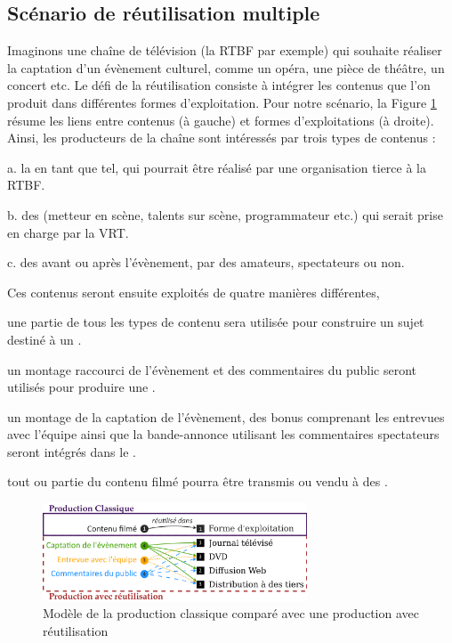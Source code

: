 \subsection{Scénario de réutilisation multiple}\label{sec:ex-reuse}
Imaginons une chaîne de télévision (la RTBF par exemple) qui souhaite réaliser la captation d'un évènement culturel, comme un opéra, une pièce de théâtre, un concert etc. 
Le défi de la réutilisation consiste à intégrer les contenus que l'on produit dans différentes formes d'exploitation. 
Pour notre scénario, la Figure \ref{img:reuse} résume les liens entre contenus (à gauche) et formes d'exploitations (à droite). 
Ainsi, les producteurs de la chaîne sont intéressés par trois types de contenus :
\begin{liste}
	\item[a.] la  en tant que tel, qui pourrait être réalisé par une organisation tierce à la RTBF.
	\item[b.] des  (metteur en scène, talents sur scène, programmateur etc.) qui serait prise en charge par la VRT. 
	\item[c.] des  avant ou après l'évènement, par des amateurs, spectateurs ou non.\\
\end{liste}

Ces contenus seront ensuite exploités de quatre manières différentes, 
\begin{listenum}
	\item une partie de tous les types de contenu sera utilisée pour construire un sujet destiné à un . 
	\item un montage raccourci de l'évènement et des commentaires du public seront utilisés pour produire une .
	\item un montage de la captation de l'évènement, des bonus comprenant les entrevues avec l'équipe ainsi que la bande-annonce utilisant les commentaires spectateurs seront intégrés dans le .	 
	\item tout ou partie du contenu filmé pourra être transmis ou vendu à des . 
\end{listenum}

\begin{figure}[ht!]
\centering
\includegraphics[width=0.7\textwidth]{images/UC-Tahnhauser-v1fr.png}
\caption{Modèle de la production classique comparé avec une production avec réutilisation}
\label{img:reuse}
\end{figure}


